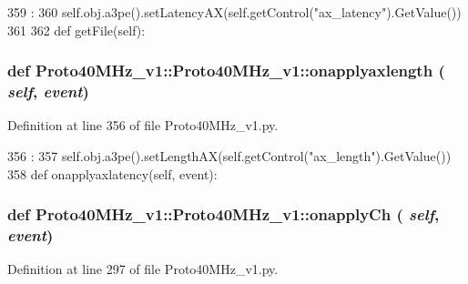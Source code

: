 \begin{DoxyCode}
359                                      :
360         self.obj.a3pe().setLatencyAX(self.getControl("ax_latency").GetValue())
361 
362 
    def getFile(self):
\end{DoxyCode}
\hypertarget{classProto40MHz__v1_1_1Proto40MHz__v1_aabfd90e2acd3f6039874a6ede6a3e664}{
\subsubsection[{onapplyaxlength}]{\setlength{\rightskip}{0pt plus 5cm}def Proto40MHz\_\-v1::Proto40MHz\_\-v1::onapplyaxlength ( {\em self}, \/   {\em event})}}
\label{classProto40MHz__v1_1_1Proto40MHz__v1_aabfd90e2acd3f6039874a6ede6a3e664}


Definition at line 356 of file Proto40MHz\_\-v1.py.


\begin{DoxyCode}
356                                     :
357         self.obj.a3pe().setLengthAX(self.getControl("ax_length").GetValue())
358 
    def onapplyaxlatency(self, event):
\end{DoxyCode}
\hypertarget{classProto40MHz__v1_1_1Proto40MHz__v1_a811e28d6f5952b47c1153458cf512e34}{
\subsubsection[{onapplyCh}]{\setlength{\rightskip}{0pt plus 5cm}def Proto40MHz\_\-v1::Proto40MHz\_\-v1::onapplyCh ( {\em self}, \/   {\em event})}}
\label{classProto40MHz__v1_1_1Proto40MHz__v1_a811e28d6f5952b47c1153458cf512e34}


Definition at line 297 of file Proto40MHz\_\-v1.py.


